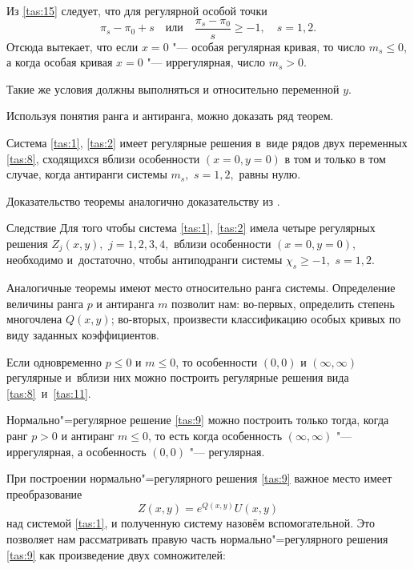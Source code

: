 Из \eqref{tas:15} следует, что для регулярной особой точки
$$
\pi_{s}-\pi_{0}+s \quad \text{или} \quad
\frac{\pi_{s}-\pi_{0}}{s}\geq-1, \quad s =1, 2.
$$
Отсюда вытекает, что если $x=0$ "--- особая регулярная кривая, то число \mbox{$m_{s}\leq0$}, а когда особая кривая $x=0$ "--- иррегулярная, число $m_{s}>0$.

Такие же условия должны выполняться и относительно
переменной $y$.

Используя понятия ранга и антиранга, можно  доказать ряд теорем.

\smallskip

\begin{theorem}[1]Система \eqref{tas:1}{\rm ,} \eqref{tas:2} имеет регулярные решения в~виде рядов двух переменных \eqref{tas:8}{\rm ,} сходящихся вблизи особенности $(x=0, y=0)$ в том и только в том случае{\rm ,} когда антиранги системы $m_{s},$ $s=1, 2,$ равны нулю{\rm .}
\end{theorem}

\smallskip

Доказательство теоремы аналогично доказательству из  \cite{tas:bib:7}.

\smallskip

\begin{newthm}{Следствие} Для того чтобы система \eqref{tas:1}{\rm ,} \eqref{tas:2} имела четыре регулярных решения $Z_{j}(x,y),$ $j=1, 2, 3, 4,$ вблизи особенности $(x=0, y=0),$ необходимо и~достаточно{\rm ,} чтобы антиподранги системы $\chi_{s}\geq-1,$ $s=1, 2.$
\end{newthm}

\smallskip

Аналогичные теоремы имеют место относительно ранга системы.
Определение величины ранга $p$ и антиранга $m$ позволит нам:
во-первых, определить степень многочлена $Q(x,y)$; во-вторых,
произвести классификацию особых кривых по виду заданных
коэффициентов.

Если одновременно $p\leq0$ и $m\leq0$, то  особенности $(0, 0)$ и $(\infty, \infty)$ регулярные и~вблизи них можно построить регулярные решения вида \eqref{tas:8}~и~\eqref{tas:11}.

\smallskip

Нормально"=регулярное решение \eqref{tas:9} можно построить только тогда, когда ранг $p>0$ и антиранг $m\leq0$, то есть когда особенность $(\infty, \infty)$ "--- иррегулярная, а особенность $(0, 0)$ "---
регулярная.

При построении нормально"=регулярного решения \eqref{tas:9} важное место имеет преобразование
\begin{equation}
Z(x,y)=e^{Q(x,y)}   U(x,y) 
\label{tas:16}
\end{equation}
над системой \eqref{tas:1}, и полученную систему назовём вспомогательной. 
Это позволяет нам рассматривать правую часть нормально"=регулярного решения \eqref{tas:9} как произведение двух сомножителей:

